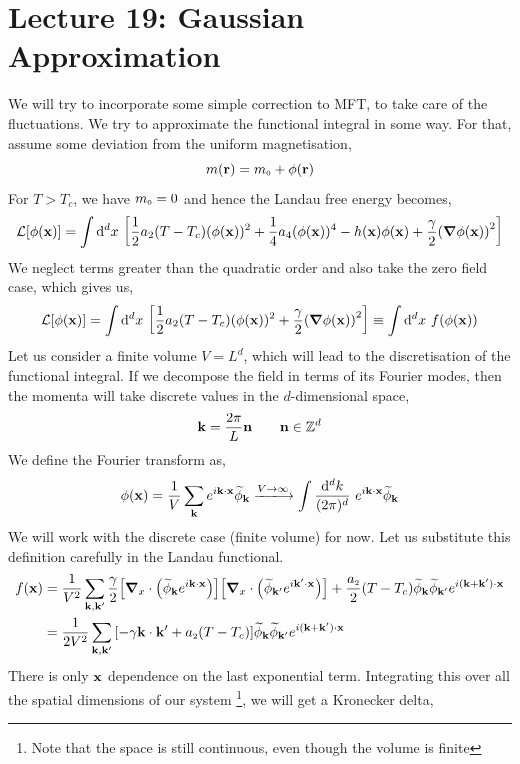 \section*{Lecture 19: Gaussian Approximation}
We will try to incorporate some simple correction to MFT, to take care of the fluctuations. We try to approximate the functional integral in some way. For that, assume some deviation from the uniform magnetisation, 
$$m(\vb{r}) = m_{\text{\tiny 0}} + \phi(\vb{r})$$
For $T>T_c$, we have $m_{\text{\tiny 0}}=0$ and hence the Landau free energy becomes, 
$$\SL[\phi(\vb{x})] = \int \dd^d x \ \qty[\frac{1}{2}a_2(T-T_c)(\phi(\vb{x}))^2 + \frac{1}{4}a_4 (\phi(\vb{x}))^4 - h(\vb{x})\phi(\vb{x}) +\frac{\gamma}{2}\qty(\grad \phi(\vb{x}))^2]$$
We neglect terms greater than the quadratic order and also take the zero field case, which gives us, 
\begin{equation}
    \SL[\phi(\vb{x})] = \int \dd^d x \ \qty[\frac{1}{2}a_2(T-T_c)(\phi(\vb{x}))^2 +\frac{\gamma}{2}\qty(\grad \phi(\vb{x}))^2]\equiv \int \dd^d x \ f(\phi(\vb{x}))
\end{equation}
Let us consider a finite volume $V = L^d$, which will lead to the discretisation of the functional integral. If we decompose the field in terms of its Fourier modes, then the momenta will take discrete values in the $d$-dimensional space,  
$$\vb{k} = \frac{2\pi}{L} \vb{n}\qquad \vb{n} \in \mathbb{Z}^d$$
We define the Fourier transform as, 
$$\phi(\vb{x}) = \frac{1}{V} \sum\limits_{\vb{k}}  e^{i \vb{k}\cdot \vb{x}} \widetilde{\phi}_{\vb{k}} \xlongrightarrow{V\to \infty} \int \frac{\dd^d k}{(2\pi)^d}\ e^{i\vb{k}\cdot \vb{x}} \widetilde{\phi}_{\vb{k}}$$
We will work with the discrete case (finite volume) for now. Let us substitute this definition carefully in the Landau functional.
\begin{align*}
    f(\vb{x}) &=\frac{1}{V^2}\sum\limits_{\vb{k}, \vb{k}'} \frac{\gamma}{2}\qty[\grad_x\cdot\qty(\widetilde{\phi}_{\vb{k}}e^{i\vb{k}\cdot \vb{x}})]\qty[\grad_x\cdot\qty(\widetilde{\phi}_{\vb{k}'}e^{i\vb{k}'\cdot \vb{x}})] + \frac{a_{\text{\tiny 2}}}{2}(T-T_c)\widetilde{\phi}_{\vb{k}}\widetilde{\phi}_{\vb{k}'}e^{i(\vb{k}+\vb{k}')\cdot \vb{x}}\\
    &=\frac{1}{2V^2}\sum\limits_{\vb{k}, \vb{k}'}\qty[-\gamma\vb{k}\cdot\vb{k}' + a_{\text{\tiny 2}}(T-T_c)]\widetilde{\phi}_{\vb{k}}\widetilde{\phi}_{\vb{k}'}e^{i(\vb{k}+\vb{k}')\cdot \vb{x}}
\end{align*}
There is only $\vb{x}$ dependence on the last exponential term. Integrating this over all the spatial dimensions of our system \footnote{Note that the space is still continuous, even though the volume is finite}, we will get a Kronecker delta, 
